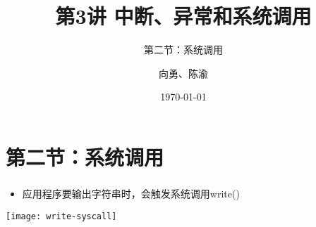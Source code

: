 


\title[第3讲]{第3讲 中断、异常和系统调用} %
\subtitle{第二节：系统调用}
\author{向勇、陈渝} %
\date{\today} %



\begin{frame}
\titlepage %
\end{frame}

\section{第二节：系统调用}%

\begin{frame}[plain]	
	\frametitle{}
	
	\begin{itemize}
		\item 应用程序要输出字符串时，会触发系统调用write()
	\end{itemize}
	
	
	\centering
	\texttt{[image: write-syscall]}
	
\end{frame}

